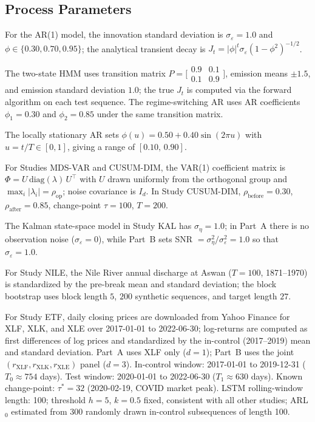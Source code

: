 \documentclass[bj,authoryear]{imsart}
\theoremstyle{plain}
\theoremstyle{definition}
\begin{document}
\subsection{Process Parameters}

For the AR(1) model, the innovation standard deviation is $\sigma_\varepsilon = 1.0$
and $\phi \in \{0.30, 0.70, 0.95\}$; the analytical transient decay is
$J_t = |\phi|^t \sigma_\varepsilon (1-\phi^2)^{-1/2}$.

The two-state HMM uses transition matrix
$P = \bigl[\begin{smallmatrix}0.9&0.1\\0.1&0.9\end{smallmatrix}\bigr]$,
emission means $\pm 1.5$, and emission standard deviation $1.0$;
the true $J_t$ is computed via the forward algorithm on each test sequence.
The regime-switching AR uses AR coefficients $\phi_1 = 0.30$ and $\phi_2 = 0.85$
under the same transition matrix.

The locally stationary AR sets $\phi(u) = 0.50 + 0.40\sin(2\pi u)$ with
$u = t/T \in [0,1]$, giving a range of $[0.10,\, 0.90]$.

For Studies MDS-VAR and CUSUM-DIM, the VAR(1) coefficient matrix is
$\Phi = U\,\mathrm{diag}(\lambda)\,U^\top$ with $U$ drawn uniformly from the
orthogonal group and $\max_i|\lambda_i| = \rho_{\mathrm{op}}$; noise covariance
is $I_d$.  In Study CUSUM-DIM, $\rho_{\mathrm{before}}=0.30$, $\rho_{\mathrm{after}}=0.85$,
change-point $\tau=100$, $T=200$.

The Kalman state-space model in Study KAL has $\sigma_\eta = 1.0$; in Part~A
there is no observation noise ($\sigma_\varepsilon = 0$), while Part~B sets
SNR $= \sigma_\eta^2/\sigma_\varepsilon^2 = 1.0$ so that $\sigma_\varepsilon = 1.0$.

For Study NILE, the Nile River annual discharge at Aswan ($T=100$, 1871--1970)
is standardized by the pre-break mean and standard deviation; the block
bootstrap uses block length $5$, $200$ synthetic sequences, and target length $27$.

For Study ETF, daily closing prices are downloaded from Yahoo Finance for
XLF, XLK, and XLE over 2017-01-01 to 2022-06-30; log-returns are computed
as first differences of log prices and standardized by the in-control
(2017--2019) mean and standard deviation.  Part~A uses XLF only ($d=1$);
Part~B uses the joint $(r_{\mathrm{XLF}}, r_{\mathrm{XLK}}, r_{\mathrm{XLE}})$
panel ($d=3$).  In-control window: 2017-01-01 to 2019-12-31 ($T_0\approx 754$ days).
Test window: 2020-01-01 to 2022-06-30 ($T_1\approx 630$ days).
Known change-point: $\tau^*=32$ (2020-02-19, COVID market peak).
LSTM rolling-window length: 100; threshold $h=5$, $k=0.5$ fixed, consistent
with all other studies; ARL$_0$ estimated from 300 randomly drawn in-control
subsequences of length 100.
\end{document}
